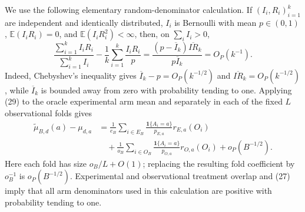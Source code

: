 We use the following elementary random-denominator calculation.  If \((I_i,R_i)_{i=1}^k\) are independent and identically distributed, \(I_i\) is Bernoulli with mean \(p\in(0,1)\), \(\mathbb E(I_iR_i)=0\), and \(\mathbb E(I_iR_i^2)<\infty\), then, on \(\sum_iI_i>0\),
\[
 \frac{\sum_{i=1}^kI_iR_i}{\sum_{i=1}^kI_i}
 -\frac1k\sum_{i=1}^k\frac{I_iR_i}{p}
 =\frac{(p-\overline I_k)\overline{IR}_k}{p\overline I_k}
 =O_P(k^{-1}).                                               \tag{29}
\]
Indeed, Chebyshev's inequality gives \(\overline I_k-p=O_P(k^{-1/2})\) and \(\overline{IR}_k=O_P(k^{-1/2})\), while \(\overline I_k\) is bounded away from zero with probability tending to one.  Applying (29) to the oracle experimental arm mean and separately in each of the fixed \(L\) observational folds gives
\[
\begin{aligned}
 \widetilde\mu_{B,d}(a)-\mu_{d,a}
 &=\frac1{e_B}\sum_{i\in E_B}
   \frac{\mathbf 1\{A_i=a\}}{p_{E,a}}r_{E,a}(O_i)\\
 &\quad+\frac1{o_B}\sum_{i\in O_B}
   \frac{\mathbf 1\{A_i=a\}}{p_{O,a}}r_{O,a}(O_i)
 +o_P(B^{-1/2}).
\end{aligned}                                                \tag{30}
\]
Here each fold has size \(o_B/L+O(1)\); replacing the resulting fold coefficient by \(o_B^{-1}\) is \(o_P(B^{-1/2})\).  Experimental and observational treatment overlap and (27) imply that all arm denominators used in this calculation are positive with probability tending to one.

